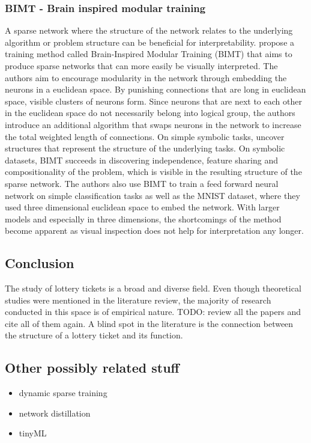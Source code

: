\subsubsection{BIMT - Brain inspired modular training}
A sparse network where the structure of the network relates to the underlying algorithm or problem structure can be beneficial for interpretability.
\textcite{BIMT} propose a training method called Brain-Inspired Modular Training (BIMT) that aims to produce sparse networks that can more easily be visually interpreted.
The authors aim to encourage modularity in the network through embedding the neurons in a euclidean space.
By punishing connections that are long in euclidean space, visible clusters of neurons form. 
Since neurons that are next to each other in the euclidean space do not necessarily belong into logical group, the authors introduce an additional algorithm that swaps neurons in the network to increase the total weighted length of connections.
On simple symbolic tasks, \autocite{BIMT} uncover structures that represent the structure of the underlying tasks.
On symbolic datasets, BIMT succeeds in discovering independence, feature sharing and compositionality of the problem, which is visible in the resulting structure of the sparse network.
The authors also use BIMT to train a feed forward neural network on simple classification tasks as well as the MNIST dataset, where they used three dimensional euclidean space to embed the network.
With larger models and especially in three dimensions, the shortcomings of the method become apparent as visual inspection does not help for interpretation any longer.


\subsection{Conclusion}
The study of lottery tickets is a broad and diverse field. Even though theoretical studies were mentioned in the literature review, the majority of research conducted in this space is of empirical nature.
TODO: review all the papers and cite all of them again.
A blind spot in the literature is the connection between the structure of a lottery ticket and its function. 

\subsection{Other possibly related stuff}
\begin{itemize}
    \item dynamic sparse training
    \item network distillation
    \item tinyML
\end{itemize}




